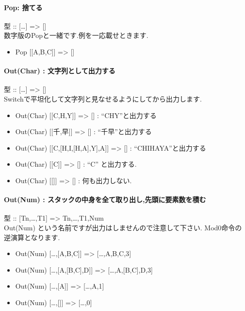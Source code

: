 \paragraph{Pop: 捨てる}

型 :: {[}\ldots{}{]} =\textgreater{}
{[}{]}\\数字版のPopと一緒です.例を一応載せときます.

\begin{itemize}
\item
  Pop {[}{[}A,B,C{]}{]} =\textgreater{} {[}{]}
\end{itemize}

\paragraph{Out(Char) : 文字列として出力する}

型 :: {[}\ldots{}{]} =\textgreater{} {[}{]}\\
Switchで平坦化して文字列と見なせるようにしてから出力します.

\begin{itemize}
\item
  Out(Char) {[}{[}C,H,Y{]}{]} =\textgreater{} {[}{]} : ``CHY''と出力する
\item
  Out(Char) {[}{[}千,早{]}{]} =\textgreater{} {[}{]} :
  ``千早''と出力する
\item
  Out(Char) {[}{[}C,{[}H,I,{[}H,A{]},Y{]},A{]}{]} =\textgreater{} {[}{]}
  : ``CHIHAYA''と出力する
\item
  Out(Char) {[}{[}C{]}{]} =\textgreater{} {[}{]} : ``C'' と出力する.
\item
  Out(Char) {[}{[}{]}{]} =\textgreater{} {[}{]} : 何も出力しない.
\end{itemize}

\paragraph{Out(Num) : スタックの中身を全て取り出し,先頭に要素数を積む}

型 :: {[}Tn,\ldots{},T1{]} =\textgreater{} Tn,\ldots{},T1,Num\\Out(Num)
という名前ですが出力はしませんので注意して下さい.
Mod0命令の逆演算となります.

\begin{itemize}
\item
  Out(Num) {[}\ldots{},{[}A,B,C{]}{]} =\textgreater{}
  {[}\ldots{},A,B,C,3{]}
\item
  Out(Num) {[}\ldots{},{[}A,{[}B,C{]},D{]}{]} =\textgreater{}
  {[}\ldots{},A,{[}B,C{]},D,3{]}
\item
  Out(Num) {[}\ldots{},{[}A{]}{]} =\textgreater{} {[}\ldots{},A,1{]}
\item
  Out(Num) {[}\ldots{},{[}{]}{]} =\textgreater{} {[}\ldots{},0{]}
\end{itemize}

